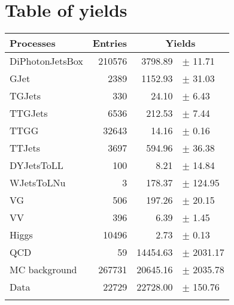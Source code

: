 \clearpage
\chapter{Table of yields}

{\renewcommand{\arraystretch}{1.0}
\begin{center}
\begin{tabular}{lrrl}
\hline\hline
Processes & Entries &\multicolumn{2}{c}{Yields}\\
\hline\hline
DiPhotonJetsBox  & 	          210576 & 	         3798.89 & $\pm$ 	      11.71\\
GJet		 & 	            2389 & 	         1152.93 & $\pm$ 	      31.03\\
TGJets		 & 	             330 & 	           24.10 & $\pm$ 	       6.43\\
TTGJets		 & 	            6536 & 	          212.53 & $\pm$ 	       7.44\\
TTGG		 & 	           32643 & 	           14.16 & $\pm$ 	       0.16\\
TTJets		 & 	            3697 & 	          594.96 & $\pm$ 	      36.38\\
DYJetsToLL	 & 	             100 & 	            8.21 & $\pm$ 	      14.84\\
WJetsToLNu	 & 	               3 & 	          178.37 & $\pm$ 	     124.95\\
VG		 & 	             506 & 	          197.26 & $\pm$ 	      20.15\\
VV		 & 	             396 & 	            6.39 & $\pm$ 	       1.45\\
Higgs		 & 	           10496 & 	            2.73 & $\pm$ 	       0.13\\
QCD		 & 	              59 & 	        14454.63 & $\pm$ 	    2031.17\\
\hline
MC background	 & 	          267731 & 	        20645.16 & $\pm$ 	    2035.78\\
Data		 & 	           22729 & 	        22728.00 & $\pm$ 	     150.76\\
\hline\hline\\
\end{tabular}
\end{center}
}

